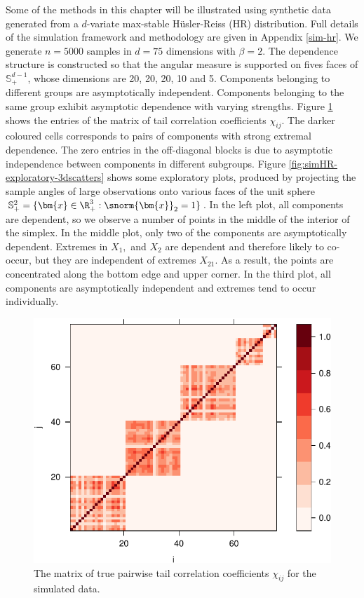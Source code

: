 \documentclass[en-GB, a4paper, nobind]{templates/bathreport}
\begin{document}
Some of the methods in this chapter will be illustrated using synthetic data generated from a \(d\)-variate max-stable Hüsler-Reiss (HR) distribution. Full details of the simulation framework and methodology are given in Appendix \ref{sim-hr}. We generate \(n=5000\) samples in \(d=75\) dimensions with \(\beta=2\). The dependence structure is constructed so that the angular measure is supported on fives faces of \(\mathbb{S}_+^{d-1}\), whose dimensions are 20, 20, 20, 10 and 5. Components belonging to different groups are asymptotically independent. Components belonging to the same group exhibit asymptotic dependence with varying strengths. Figure \ref{fig:simHR-exploratory-Chi} shows the entries of the matrix of tail correlation coefficients \(\chi_{ij}\). The darker coloured cells corresponds to pairs of components with strong extremal dependence. The zero entries in the off-diagonal blocks is due to asymptotic independence between components in different subgroups. Figure \ref{fig:simHR-exploratory-3dscatters} shows some exploratory plots, produced by projecting the sample angles of large observations onto various faces of the unit sphere \(\mathbb{S}_+^{2}=\{\bm{x}\in\R^3_+:\snorm{\bm{x}}_2=1\}\). In the left plot, all components are dependent, so we observe a number of points in the middle of the interior of the simplex. In the middle plot, only two of the components are asymptotically dependent. Extremes in \(X_1,\) and \(X_2\) are dependent and therefore likely to co-occur, but they are independent of extremes \(X_{21}\). As a result, the points are concentrated along the bottom edge and upper corner. In the third plot, all components are asymptotically independent and extremes tend to occur individually.

\begin{figure}

{\centering \includegraphics[width=0.6\linewidth]{figures/simHR-exploratory-Chi-1} 

}

\caption[True pairwise tail correlation coefficients for the simulated data.]{The matrix of true pairwise tail correlation coefficients $\chi_{ij}$ for the simulated data.}\label{fig:simHR-exploratory-Chi}
\end{figure}
\end{document}
